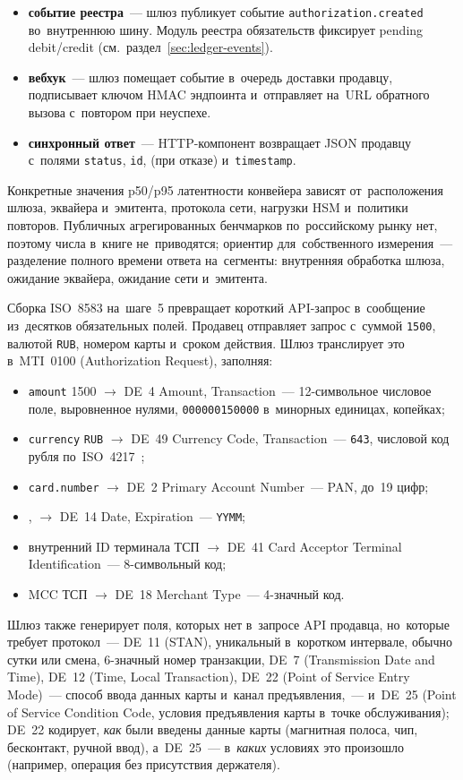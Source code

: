 \begin{itemize}
    запись транзакции.
  \item \textbf{событие реестра}~--- шлюз публикует событие
    \texttt{authorization.created} во~внутреннюю шину. Модуль реестра
    обязательств фиксирует pending debit/credit
    (см.~раздел~\ref{sec:ledger-events}).
  \item \textbf{вебхук}~--- шлюз помещает событие в~очередь доставки продавцу,
    подписывает ключом HMAC эндпоинта и~отправляет на~URL обратного
    вызова с~повтором при неуспехе.
  \item \textbf{синхронный ответ}~--- HTTP-компонент возвращает JSON продавцу
    с~полями \texttt{status}, \texttt{id},  (при отказе)
    и~\texttt{timestamp}.
\end{itemize}

Конкретные значения p50/p95 латентности конвейера зависят от~расположения
шлюза, эквайера и~эмитента, протокола сети, нагрузки HSM и~политики повторов.
Публичных агрегированных бенчмарков по~российскому рынку
нет, поэтому числа в~книге не~приводятся; ориентир для~собственного
измерения~--- разделение полного времени ответа на~сегменты: внутренняя
обработка шлюза, ожидание эквайера, ожидание сети и~эмитента.

Сборка ISO~8583 на~шаге~5 превращает короткий API-запрос в~сообщение
из~десятков обязательных полей. Продавец отправляет запрос с~суммой
\texttt{1500}, валютой \texttt{RUB}, номером карты и~сроком действия. Шлюз
транслирует это в~MTI~0100 (Authorization Request), заполняя:

\begin{itemize}
  \item \texttt{amount} 1500 $\to$ DE~4 Amount, Transaction~--- 12-символьное
    числовое поле, выровненное нулями, \texttt{000000150000} в~минорных
    единицах, копейках;
  \item \texttt{currency} \texttt{RUB} $\to$ DE~49 Currency Code,
    Transaction~--- \texttt{643}, числовой код рубля по~ISO~4217~\cite{iso-4217};
  \item \texttt{card.number} $\to$ DE~2 Primary Account Number~--- PAN, до~19
    цифр;
  \item {},  $\to$
    DE~14 Date, Expiration~--- \texttt{YYMM};
  \item внутренний ID терминала ТСП $\to$ DE~41 Card Acceptor Terminal
    Identification~--- 8-символьный код;
  \item MCC ТСП $\to$ DE~18 Merchant Type~--- 4-значный код.
\end{itemize}
Шлюз также генерирует поля, которых нет в~запросе API
продавца, но~которые требует протокол~--- DE~11 (STAN), уникальный
в~коротком интервале, обычно сутки или смена, 6-значный
номер транзакции, DE~7 (Transmission Date
and Time), DE~12 (Time, Local Transaction), DE~22 (Point
of Service Entry Mode)~--- способ ввода данных карты
и~канал предъявления,~--- и~DE~25 (Point of Service Condition Code,
условия предъявления карты в~точке обслуживания); DE~22 кодирует,
\emph{как} были введены данные карты (магнитная полоса, чип,
бесконтакт, ручной ввод), а~DE~25~--- в~\emph{каких} условиях это
произошло (например, операция без присутствия держателя).


